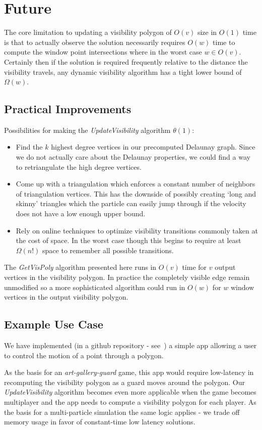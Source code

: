\section{Future} \label{sec:future}

The core limitation to updating a visibility polygon of $O(v)$ size in
$O(1)$ time is that to actually observe the solution necessarily
requires $O(w)$ time to compute the window point intersections where
in the worst case $w \in O(v)$. Certainly then if the solution is
required frequently relative to the distance the visibility travels,
any dynamic visibility algorithm has a tight lower bound of
$\Omega(w)$.

\subsection{Practical Improvements} \label{sec:improvements}

Possibilities for making the \emph{UpdateVisibility} algorithm $\theta(1)$:
\begin{itemize}
\item Find the $k$ highest degree vertices in our precomputed Delaunay
graph. Since we do not actually care about the Delaunay properties, we
could find a way to retriangulate the high degree vertices.
\item Come up with a triangulation which enforces a constant number of
neighbors of triangulation vertices. This has the downside of possibly
creating `long and skinny' triangles which the particle can easily
jump through if the velocity does not have a low enough upper bound.
\item Rely on online techniques to optimize visibility transitions
commonly taken at the cost of space. In the worst case though this
begins to require at least $\Omega(n!)$ space to remember
all possible transitions.
\end{itemize}

The \emph{GetVisPoly} algorithm presented here runs in $O(v)$ time for
$v$ output vertices in the visibility polygon. In practice the completely
visible edge remain unmodified so a more sophisticated algorithm could
run in $O(w)$ for $w$ window vertices in the output visibility polygon.

\subsection{Example Use Case} \label{sec:use-cases}

We have implemented (in a github repository - see~\cite{visibility-github})
a simple app allowing a user to control the motion of a point through a
polygon.

As the basis for an \emph{art-gallery-guard} game, this app would
require low-latency in recomputing the visibility polygon as a guard
moves around the polygon. Our \emph{UpdateVisibility} algorithm becomes
even more applicable when the game becomes multiplayer and the app needs
to compute a visibility polygon for each player.
As the basis for a multi-particle simulation the same logic applies -
we trade off memory usage in favor of constant-time low latency solutions.

